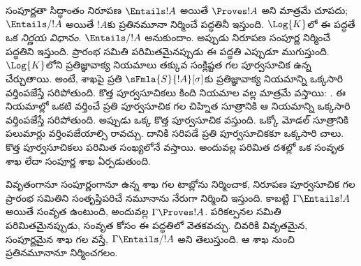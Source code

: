 \documentclass[../../../include/open-logic-section]{subfiles}
\begin{document}


\begin{explain}
సంపూర్ణతా సిద్ధాంతం నిరూపణ $\Entails !A$ అయితే
  $\Proves !A$ అని మాత్రమే చూపదు; $\Entails/ !A$ అయితే
  $!A$కు ప్రతినమూనా నిర్మించే పద్ధతినీ ఇస్తుంది.
$\Log{K}$లో ఈ పద్ధతే ఒక \emph{నిర్ణయ విధానం}.
  $\Entails/ !A$ అనుకుందాం. అప్పుడు
   నిరూపణ సంపూర్ణ
   నిర్మించే పద్ధతిని ఇస్తుంది.
  ప్రారంభ సమితి పరిమితమైనప్పుడు ఈ పద్ధతి ఎప్పుడూ ముగుస్తుంది.
$\Log{K}$లోని ప్రతిజ్ఞావాక్య నియమాలు తక్కువ సంక్లిష్టత గల
పూర్వసూచిక ఉన్న  చేర్చుతాయి. అంటే,
  శాఖపై ప్రతి $\sFmla{S}{!A}[\sigma]$కు ప్రతిజ్ఞావాక్య
  నియమాన్ని ఒక్కసారి వర్తింపజేస్తే సరిపోతుంది. కొత్త పూర్వసూచికలు
  కింది నియమాల వల్ల మాత్రమే వస్తాయి:
  .
  ఈ నియమాల్లో ఒకటి వర్తించే ప్రతి పూర్వసూచిక గల చిహ్నిత సూత్రానికి
ఆ నియమాన్ని ఒక్కసారి వర్తింపజేస్తే సరిపోతుంది. అప్పుడు
  ఒక్క కొత్త పూర్వసూచిక వస్తుంది.
  ఒక్కో మోడల్ సూత్రానికి పలుమార్లు వర్తింపజేయాల్సి రావచ్చు.
  దానికి సరిపడే ప్రతి పూర్వసూచికకూ ఒక్కసారి చాలు.
  కొత్త పూర్వసూచికలు పరిమిత సంఖ్యలోనే వస్తాయి. అందువల్ల
  పరిమిత దశల్లో ఒక సంవృత శాఖ లేదా సంపూర్ణ శాఖ ఏర్పడుతుంది.

  వివృతంగానూ సంపూర్ణంగానూ ఉన్న శాఖ గల టాబ్లోను
  నిర్మించాక,  నిరూపణ
  పూర్వసూచిక గల  ప్రారంభ
  సమితిని సంతృప్తిపరిచే నమూనాను నేరుగా నిర్మించి ఇస్తుంది.
  కాబట్టి $\Gamma \Entails !A$ అయితే సంవృత
   ఉంటుంది, అందువల్ల $\Gamma \Proves !A$.
  పరికల్పనల సమితి పరిమితమైనప్పుడు, సంవృత
   కోసం ఈ పద్ధతిలో వెతకవచ్చు.
  చివరికి వివృతమైన, సంపూర్ణమైన శాఖ గల
   వస్తే,
  $\Gamma \Entails/ !A$ అని తెలుస్తుంది. ఆ శాఖ నుంచి
  ప్రతినమూనానూ నిర్మించగలం.
\end{explain}
\end{document}
